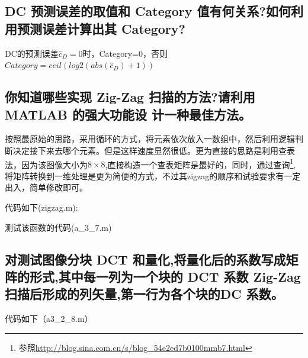 \documentclass{ctexart}
\begin{document}
\subsection{
DC 预测误差的取值和 Category 值有何关系?如何利用预测误差计算出其 Category?
}

DC的预测误差$\hat{c}_D=0$时，Category=0，否则$Category=ceil(log2(abs(\hat{c}_D)+1))$

\subsection{
 你知道哪些实现 Zig-Zag 扫描的方法?请利用 MATLAB 的强大功能设
计一种最佳方法。
}
按照最原始的思路，采用循环的方式，将元素依次放入一数组中，然后利用逻辑判断决定接下来去哪个元素。但是这样速度显然很低。更为直接的思路是利用查表法，因为该图像大小为$8\times8$,直接构造一个查表矩阵是最好的，同时，通过查询\footnote{参照\url{http://blog.sina.com.cn/s/blog_54e2ed7b0100mmb7.html}},将矩阵转换到一维处理是更为简便的方式，不过其zigzag的顺序和试验要求有一定出入，简单修改即可。

代码如下(zigzag.m):

测试该函数的代码(a\_3\_7.m)


\subsection{
对测试图像分块 DCT 和量化,将量化后的系数写成矩阵的形式,其中每一列为一个块的 DCT 系数 Zig-Zag 扫描后形成的列矢量,第一行为各个块的DC 系数。
}
代码如下（a3\_2\_8.m）

\end{document}
